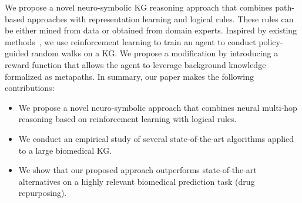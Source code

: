 \documentclass{article}
\begin{document}
We propose a novel neuro-symbolic KG reasoning approach that combines path-based approaches with representation learning and logical rules.
These rules can be either mined from data or obtained from domain experts. Inspired by existing methods~\cite{minerva,lin2018multi,hildebr2020scene, hildebrandt2020reasoning}, we use reinforcement learning to train an agent to conduct policy-guided random walks on a KG. We propose a modification by introducing a reward function that allows the agent to leverage background knowledge formalized as metapaths. 
In summary, our paper makes the following contributions:
\begin{itemize}
    \item We propose a novel neuro-symbolic approach that combines neural multi-hop reasoning based on reinforcement learning with logical rules.
    \item We conduct an empirical study of several state-of-the-art algorithms applied to a large biomedical KG.
    \item We show that our proposed approach outperforms state-of-the-art alternatives on a highly relevant biomedical prediction task (drug repurposing).
\end{itemize}
\noindent

\end{document}
